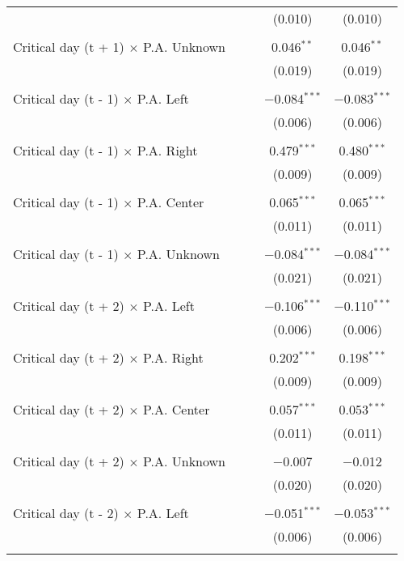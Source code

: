 \documentclass[
]{article}
\begin{document}
\begin{table}[!htbp]
{\begin{tabular}{@{\extracolsep{5pt}}lcccc}
  &  &  & (0.010) & (0.010) \\ 
  & & & & \\ 
 Critical day (t + 1) $\times$ P.A. Unknown &  &  & 0.046$^{**}$ & 0.046$^{**}$ \\ 
  &  &  & (0.019) & (0.019) \\ 
  & & & & \\ 
 Critical day (t - 1) $\times$ P.A. Left &  &  & $-$0.084$^{***}$ & $-$0.083$^{***}$ \\ 
  &  &  & (0.006) & (0.006) \\ 
  & & & & \\ 
 Critical day (t - 1) $\times$ P.A. Right &  &  & 0.479$^{***}$ & 0.480$^{***}$ \\ 
  &  &  & (0.009) & (0.009) \\ 
  & & & & \\ 
 Critical day (t - 1) $\times$ P.A. Center &  &  & 0.065$^{***}$ & 0.065$^{***}$ \\ 
  &  &  & (0.011) & (0.011) \\ 
  & & & & \\ 
 Critical day (t - 1) $\times$ P.A. Unknown &  &  & $-$0.084$^{***}$ & $-$0.084$^{***}$ \\ 
  &  &  & (0.021) & (0.021) \\ 
  & & & & \\ 
 Critical day (t + 2) $\times$ P.A. Left &  &  & $-$0.106$^{***}$ & $-$0.110$^{***}$ \\ 
  &  &  & (0.006) & (0.006) \\ 
  & & & & \\ 
 Critical day (t + 2) $\times$ P.A. Right &  &  & 0.202$^{***}$ & 0.198$^{***}$ \\ 
  &  &  & (0.009) & (0.009) \\ 
  & & & & \\ 
 Critical day (t + 2) $\times$ P.A. Center &  &  & 0.057$^{***}$ & 0.053$^{***}$ \\ 
  &  &  & (0.011) & (0.011) \\ 
  & & & & \\ 
 Critical day (t + 2) $\times$ P.A. Unknown &  &  & $-$0.007 & $-$0.012 \\ 
  &  &  & (0.020) & (0.020) \\ 
  & & & & \\ 
 Critical day (t - 2) $\times$ P.A. Left &  &  & $-$0.051$^{***}$ & $-$0.053$^{***}$ \\ 
  &  &  & (0.006) & (0.006) \\ 
  & & & & \\ 

\end{tabular}}
\end{table}
\end{document}
